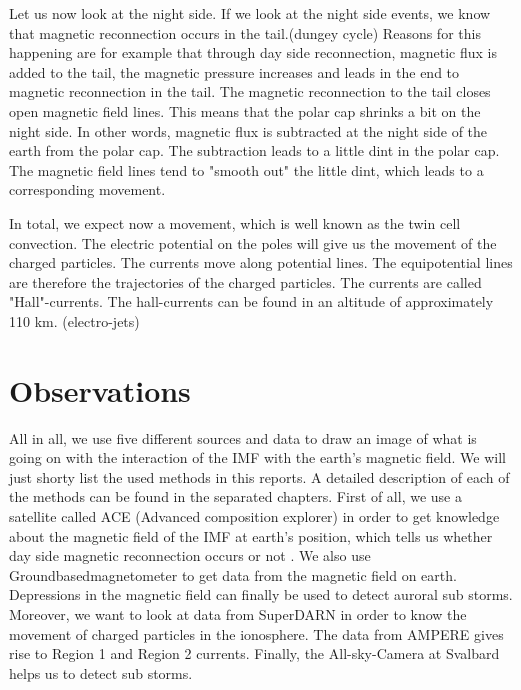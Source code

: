 \documentclass[10pt,a4paper]{article}
\begin{document}
Let us now look at the night side. If we look at the night side events, we know that magnetic reconnection occurs in the tail.(dungey cycle) Reasons for this happening are for example that through day side reconnection, magnetic flux is added to the tail, the magnetic pressure increases and leads in the end to magnetic reconnection in the tail. 
The magnetic reconnection to the tail closes open magnetic field lines. This means that the polar cap shrinks a bit on the night side. In other words, magnetic flux is subtracted at the night side of the earth from the polar cap. The subtraction leads to a little dint in the polar cap. The magnetic field lines tend to "smooth out" the little dint, which leads to a corresponding movement. 

In total, we expect now a movement, which is well known as the twin cell convection. The electric potential on the poles will give us the movement of the charged particles. The currents move along potential lines. The equipotential lines are therefore the trajectories of the charged particles. The currents are called "Hall"-currents. The hall-currents can be found in an altitude of approximately 110 km. (electro-jets)


\section{Observations}

All in all, we use five different sources and data to draw an image of what is going on with the interaction of the IMF with the earth's magnetic field. We will just shorty list the used methods in this reports. A detailed description of each of the methods can be found in the separated chapters. 
First of all, we use a satellite called ACE (Advanced composition explorer) in order to get knowledge about the magnetic field of the IMF at earth's position, which tells us whether day side magnetic reconnection occurs or not . 
We also use Groundbasedmagnetometer to get data from the magnetic field on earth. Depressions in the magnetic field can finally be used to detect auroral sub storms. 
Moreover, we want to look at data from SuperDARN in order to know the movement of charged particles in the ionosphere.
The data from AMPERE gives rise to Region 1 and Region 2 currents. 
Finally, the All-sky-Camera at Svalbard helps us to detect sub storms.  
\end{document}
